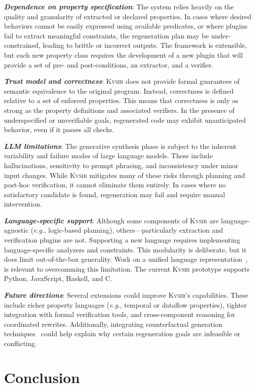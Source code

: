 \documentclass[sigplan]{acmart}
\def\eg{{\em e.g.}, }
\newcommand{\sys}{{\scshape Kv{\textalpha}sir}\xspace}
\newcommand{\heading}[1]{\vspace{2pt}\noindent\textbf{\emph{#1}}:\enspace}
\begin{document}
\heading{Dependence on property specification}
The system relies heavily on the quality and granularity of extracted or declared properties.
In cases where desired behaviors cannot be easily expressed using available predicates, or where plugins fail to extract meaningful constraints, the regeneration plan may be under-constrained, leading to brittle or incorrect outputs. The framework is extensible, but each new property class requires the development of a new plugin that will provide a set of pre- and post-conditions, an extractor, and a verifier.

\heading{Trust model and correctness}
\sys does not provide formal guarantees of semantic equivalence to the original program. Instead, correctness is defined relative to a set of enforced properties. This means that correctness is only as strong as the property definitions and associated verifiers.
In the presence of underspecified or unverifiable goals, regenerated code may exhibit unanticipated behavior, even if it passes all checks.

\heading{LLM limitations}
The generative synthesis phase is subject to the inherent variability and failure modes of large language models. These include hallucinations, sensitivity to prompt phrasing, and inconsistency under minor input changes. While \sys mitigates many of these risks through planning and post-hoc verification, it cannot eliminate them entirely.
In cases where no satisfactory candidate is found, regeneration may fail and require manual intervention.

\heading{Language-specific support}
Although some components of \sys are language-agnostic (\eg logic-based planning), others—particularly extraction and verification plugins are not.
Supporting a new language requires implementing language-specific analyzers and constraints. This modularity is deliberate, but it does limit out-of-the-box generality.
Work on a unified language representation~\cite{koppel2018onetool,bap2011,dillig2009sail}, is relevant to overcomming this limitation.
The current \sys prototype supports Python, JavaScript, Haskell, and C.

\heading{Future directions}
Several extensions could improve \sys's capabilities. These include richer property languages (\eg temporal or dataflow properties), tighter integration with formal verification tools, and cross-component reasoning for coordinated rewrites.
Additionally, integrating counterfactual generation techniques~\cite{Cabalar_2020} could help explain why certain regeneration goals are infeasible or conflicting.


\section{Conclusion}



\end{document}
